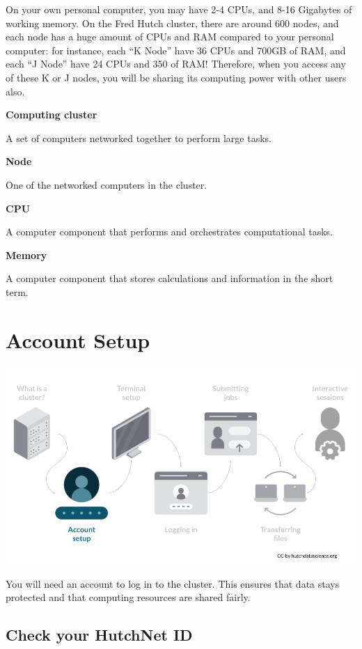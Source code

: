 \documentclass[
]{book}
\begin{document}
On your own personal computer, you may have 2-4 CPUs, and 8-16 Gigabytes of working memory. On the Fred Hutch cluster, there are around 600 nodes, and each node has a huge amount of CPUs and RAM compared to your personal computer: for instance, each ``K Node'' have 36 CPUs and 700GB of RAM, and each ``J Node'' have 24 CPUs and 350 of RAM! Therefore, when you access any of these K or J nodes, you will be sharing its computing power with other users also.

\textbf{Computing cluster}

A set of computers networked together to perform large tasks.

\textbf{Node}

One of the networked computers in the cluster.

\textbf{CPU}

A computer component that performs and orchestrates computational tasks.

\textbf{Memory}

A computer component that stores calculations and information in the short term.

\hypertarget{account-setup}{%
\chapter{Account Setup}\label{account-setup}}

\begin{center}\includegraphics[width=0.8\linewidth]{resources/images/02-accounts_files/figure-latex//1BQxrVYdKZTbpCaF-i_q9w7s9x034lEXpQZDU-Sl09cs_gff2211b72f_1_160} \end{center}

You will need an account to log in to the cluster. This ensures that data stays protected and that computing resources are shared fairly.

\hypertarget{check-your-hutchnet-id}{%
\section{Check your HutchNet ID}\label{check-your-hutchnet-id}}
\end{document}
